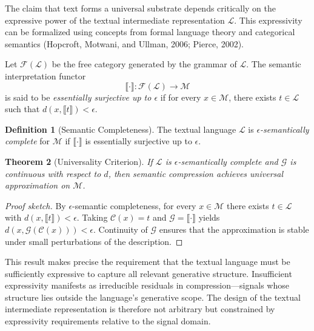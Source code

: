 \documentclass[11pt,a4paper]{article}
\newtheorem{theorem}{Theorem}[section]
\theoremstyle{definition}
\newtheorem{definition}[theorem]{Definition}
\theoremstyle{remark}
\begin{document}
The claim that text forms a universal substrate depends critically on the expressive power of the textual intermediate representation $\mathcal{L}$. This expressivity can be formalized using concepts from formal language theory and categorical semantics (Hopcroft, Motwani, and Ullman, 2006; Pierce, 2002).

Let $\mathcal{F}(\mathcal{L})$ be the free category generated by the grammar of $\mathcal{L}$. The semantic interpretation functor
\[
\llbracket \cdot \rrbracket : \mathcal{F}(\mathcal{L}) \to \mathcal{M}
\]
is said to be \emph{essentially surjective up to $\epsilon$} if for every $x \in \mathcal{M}$, there exists $t \in \mathcal{L}$ such that $d(x, \llbracket t \rrbracket) < \epsilon$.

\begin{definition}[Semantic Completeness]
\label{def:semcomp}
The textual language $\mathcal{L}$ is \emph{$\epsilon$-semantically complete} for $\mathcal{M}$ if $\llbracket \cdot \rrbracket$ is essentially surjective up to $\epsilon$.
\end{definition}

\begin{theorem}[Universality Criterion]
If $\mathcal{L}$ is $\epsilon$-semantically complete and $\mathcal{G}$ is continuous with respect to $d$, then semantic compression achieves universal approximation on $\mathcal{M}$.
\end{theorem}

\begin{proof}[Proof sketch]
By $\epsilon$-semantic completeness, for every $x \in \mathcal{M}$ there exists $t \in \mathcal{L}$ with $d(x, \llbracket t \rrbracket) < \epsilon$. Taking $\mathcal{C}(x) = t$ and $\mathcal{G} = \llbracket \cdot \rrbracket$ yields $d(x, \mathcal{G}(\mathcal{C}(x))) < \epsilon$. Continuity of $\mathcal{G}$ ensures that the approximation is stable under small perturbations of the description.
\end{proof}

This result makes precise the requirement that the textual language must be sufficiently expressive to capture all relevant generative structure. Insufficient expressivity manifests as irreducible residuals in compression---signals whose structure lies outside the language's generative scope. The design of the textual intermediate representation is therefore not arbitrary but constrained by expressivity requirements relative to the signal domain.

\end{document}
